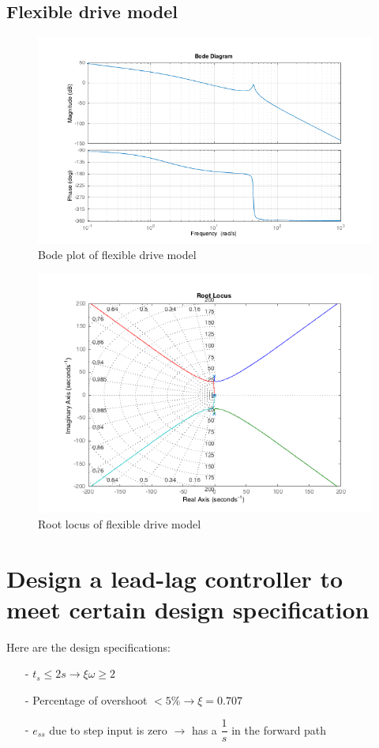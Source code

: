 \documentclass[a4paper, 12pt]{article}
\begin{document}
\subsection{Flexible drive model}
\begin{figure}[!h]
\centering
\includegraphics[width = 1\linewidth]{FlexibleBodePlot}
\caption{Bode plot of flexible drive model}
\label{FlexibleBodePlot}
\end{figure}
\begin{figure}[!h]
\centering
\includegraphics[width = 0.9\linewidth]{FlexiblerLocus}
\caption{Root locus of flexible drive model}
\label{FlexiblerLocus}
\end{figure}

\vspace{7ex}
\section{Design a lead-lag controller to meet certain design specification}\label{DesignRequirements}
\hspace{2.5ex} Here are the design specifications: 
\begin{enumerate}
\item[-]{$t_s \le 2s \longrightarrow \xi \omega \ge 2 $}
\item[-]{Percentage of overshoot $< 5\% \longrightarrow \xi = 0.707$}
\item[-]{$e_{ss}$ due to step input is zero $\longrightarrow$ has a $\dfrac{1}{s}$ in the forward path}
\end{enumerate}
\end{document}

